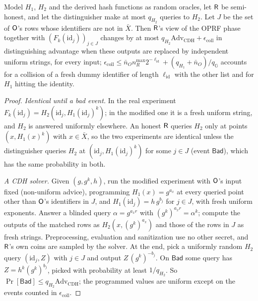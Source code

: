 \begin{lemma}\label{lem:keyed}
Model $H_1$, $H_2$ and the derived hash functions as random oracles, let $\mathsf{R}$ be semi-honest, and let the distinguisher make at most $q_{H_2}$ queries to $H_2$. Let $J$ be the set of $\mathsf{O}$'s rows whose identifiers are not in $\bar X$. Then $\mathsf{R}$'s view of the OPRF phase together with $(F_k(\mathrm{id}_j))_{j\in J}$ changes by at most $q_{H_2}\mathrm{Adv}_{\mathrm{CDH}}+\epsilon_{\mathrm{coll}}$ in distinguishing advantage when these outputs are replaced by independent uniform strings, for every input; $\epsilon_{\mathrm{coll}}\le\bar n_On_R^{\max}2^{-\ell_{\mathrm{id}}}+(q_{H_1}+\bar n_O)/q_{\mathbb G}$ accounts for a collision of a fresh dummy identifier of length $\ell_{\mathrm{id}}$ with the other list and for $H_1$ hitting the identity.
\end{lemma}
\begin{proof}
\emph{Identical until a bad event.} In the real experiment $F_k(\mathrm{id}_j)=H_2(\mathrm{id}_j,H_1(\mathrm{id}_j)^k)$; in the modified one it is a fresh uniform string, and $H_2$ is answered uniformly elsewhere. An honest $\mathsf{R}$ queries $H_2$ only at points $(x,H_1(x)^k)$ with $x\in\bar X$, so the two experiments are identical unless the distinguisher queries $H_2$ at $(\mathrm{id}_j,H_1(\mathrm{id}_j)^k)$ for some $j\in J$ (event $\mathsf{Bad}$), which has the same probability in both.

\emph{A CDH solver.} Given $(g,g^k,h)$, run the modified experiment with $\mathsf{O}$'s input fixed (non-uniform advice), programming $H_1(x)=g^{a_x}$ at every queried point other than $\mathsf{O}$'s identifiers in $J$, and $H_1(\mathrm{id}_j)=h\,g^{b_j}$ for $j\in J$, with fresh uniform exponents. Answer a blinded query $\alpha=g^{a_xr}$ with $(g^k)^{a_xr}=\alpha^k$; compute the outputs of the matched rows as $H_2(x,(g^k)^{a_x})$ and those of the rows in $J$ as fresh strings. Preprocessing, evaluation and sanitization use no other secret, and $\mathsf{R}$'s own coins are sampled by the solver. At the end, pick a uniformly random $H_2$ query $(\mathrm{id}_j,Z)$ with $j\in J$ and output $Z\,(g^k)^{-b_j}$. On $\mathsf{Bad}$ some query has $Z=h^k(g^k)^{b_j}$, picked with probability at least $1/q_{H_2}$. So $\Pr[\mathsf{Bad}]\le q_{H_2}\mathrm{Adv}_{\mathrm{CDH}}$; the programmed values are uniform except on the events counted in $\epsilon_{\mathrm{coll}}$.
\end{proof}

